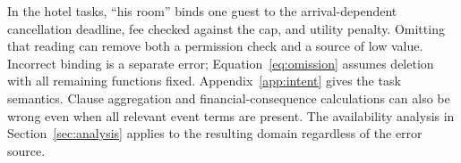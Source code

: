 In the hotel tasks, ``his room'' binds one guest to the arrival-dependent cancellation deadline, fee checked against the cap, and utility penalty. Omitting that reading can remove both a permission check and a source of low value. Incorrect binding is a separate error; Equation~\eqref{eq:omission} assumes deletion with all remaining functions fixed. Appendix~\ref{app:intent} gives the task semantics. Clause aggregation and financial-consequence calculations can also be wrong even when all relevant event terms are present. The availability analysis in Section~\ref{sec:analysis} applies to the resulting domain regardless of the error source.
